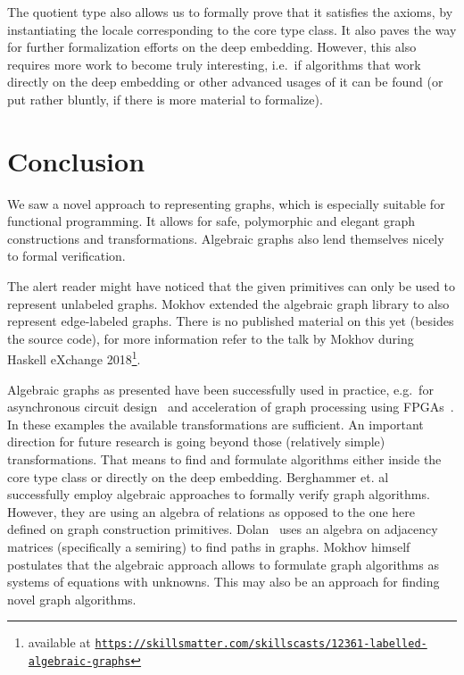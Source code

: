 \documentclass{article}
\begin{document}
The quotient type also allows us to formally prove that it satisfies the axioms,
by instantiating the locale corresponding to the core type class. It also paves
the way for further formalization efforts on the deep embedding. However, this
also requires more work to become truly interesting, i.e.\ if algorithms that
work directly on the deep embedding or other advanced usages of it can be found
(or put rather bluntly, if there is more material to formalize).

\section{Conclusion}\label{sec:conclusion}
We saw a novel approach to representing graphs, which is especially suitable for
functional programming. It allows for safe, polymorphic and elegant graph
constructions and transformations. Algebraic graphs also lend themselves nicely
to formal verification.

The alert reader might have noticed that the given primitives can only be used
to represent unlabeled graphs. Mokhov extended the algebraic graph library to
also represent edge-labeled graphs. There is no published material on this yet
(besides the source code), for more information refer to the talk by Mokhov
during Haskell eXchange 2018\footnote{available at
  \texttt{\href{https://skillsmatter.com/skillscasts/12361-labelled-algebraic-graphs}{https://skillsmatter.com/skillscasts/12361-labelled-algebraic-graphs}}}.

Algebraic graphs as presented have been successfully used in practice, e.g.\ for
asynchronous circuit design~\cite{beaumont2017high} and acceleration of graph
processing using FPGAs~\cite{mokhov2019language}. In these examples
the available transformations are sufficient. An important direction for future
research is going beyond those (relatively simple) transformations. That means
to find and formulate algorithms either inside the core type class or directly
on the deep embedding. Berghammer et. al~\cite{berghammer2020relational}
successfully employ algebraic approaches to formally verify graph algorithms.
However, they are using an algebra of relations as opposed to the one here
defined on graph construction primitives. Dolan~\cite{dolan2013fun} uses an
algebra on adjacency matrices (specifically a semiring) to find paths in graphs.
Mokhov himself postulates that the algebraic approach allows to formulate graph
algorithms as systems of equations with unknowns. This may also be an approach
for finding novel graph algorithms.

\printbibliography
\end{document}

